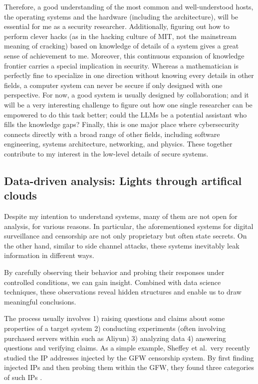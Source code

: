 \documentclass{article}
\begin{document}
Therefore, a good understanding of the most common and well-understood hosts,
the operating systems and the hardware (including the architecture), will be
essential for me as a security researcher. Additionally, figuring out how to
perform clever hacks (as in the hacking culture of MIT, not the mainstream
meaning of cracking) based on knowledge of details of a system gives a great
sense of achievement to me. Moreover, this continuous expansion of knowledge
frontier carries a special implication in security. Whereas a mathematician is
perfectly fine to specialize in one direction without knowing every details in
other fields, a computer system can never be secure if only designed with one
perspective. For now, a good system is usually designed by collaboration; and
it will be a very interesting challenge to figure out how one single researcher
can be empowered to do this task better; could the LLMs be a potential
assistant who fills the knowledge gaps? Finally, this is one major place where
cybersecurity connects directly with a broad range of other fields, including
software engineering, systems architecture, networking, and physics.  These
together contribute to my interest in the low-level details of secure systems.

\subsection{Data-driven analysis: Lights through artifical clouds}
Despite my intention to understand systems, many of them are not open for
analysis, for various reasons. In particular, the aforementioned systems for
digital surveillance and censorship are not only proprietary but often state
secrets. On the other hand, similar to side channel attacks, these systems
inevitably leak information in different ways.

By carefully observing their behavior and probing their responses under
controlled conditions, we can gain insight. Combined with data science
techniques, these observations reveal hidden structures and enable us to draw
meaningful conclusions.

The process usually involves 1) raising questions and claims about some
properties of a target system 2) conducting experiments (often involving
purchased servers within such as Aliyun) 3) analyzing data 4) answering
questions and verifying claims. As a simple example, Sheffey et al.\ very
recently studied the IP addresses injected by the GFW censorship system. By
first finding injected IPs and then probing them within the GFW, they found
three categories of such IPs \cite{gfw.injected.ip}. 
\end{document}
